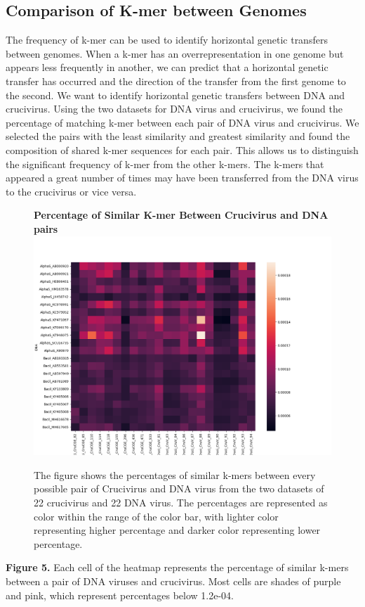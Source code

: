 \documentclass[eng]{ajceam-class}
\begin{document}
\subsection{Comparison of K-mer between Genomes}

The frequency of k-mer can be used to identify horizontal genetic transfers between genomes. When a k-mer has an overrepresentation in one genome but appears less frequently in another, we can predict that a horizontal genetic transfer has occurred and the direction of the transfer from the first genome to the second. We want to identify horizontal genetic transfers between DNA and crucivirus. Using the two datasets for DNA virus and crucivirus, we found the percentage of matching k-mer between each pair of DNA virus and crucivirus. We selected the pairs with the least similarity and greatest similarity and found the composition of shared k-mer sequences for each pair. This allows us to distinguish the significant frequency of k-mer from the other k-mers. The k-mers that appeared a great number of times may have been transferred from the DNA virus to the crucivirus or vice versa.

\begin{figure}
    \centering
    \textbf{Percentage of Similar K-mer Between Crucivirus and DNA pairs}
    \includegraphics[scale = 0.3]{ComparisonBetweenDNAandCruci.png}
    \caption{The figure shows the percentages of similar k-mers between every possible pair of Crucivirus and DNA virus from the two datasets of 22 crucivirus and 22 DNA virus. The percentages are represented as color within the range of the color bar, with lighter color representing higher percentage and darker color representing lower percentage.}
\end{figure}
\textbf{Figure 5.} Each cell of the heatmap represents the percentage of similar k-mers between a pair of DNA viruses and crucivirus. Most cells are shades of purple and pink, which represent percentages below 1.2e-04. 
\end{document}
